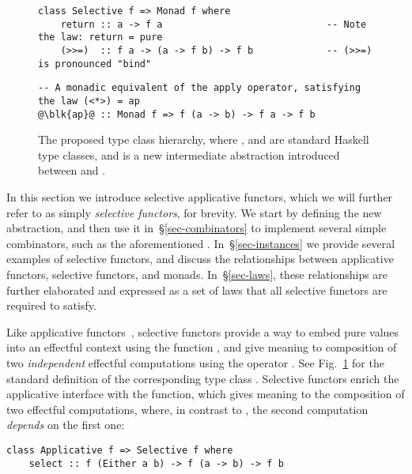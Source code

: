 \begin{figure}
\begin{verbatim}
class Selective f => Monad f where
    return :: a -> f a                             -- Note the law: return = pure
    (>>=)  :: f a -> (a -> f b) -> f b             -- (>>=) is pronounced "bind"
\end{verbatim}
\vspace{0.5mm}
\begin{verbatim}
-- A monadic equivalent of the apply operator, satisfying the law (<*>) = ap
@\blk{ap}@ :: Monad f => f (a -> b) -> f a -> f b
\end{verbatim}
\caption{The proposed type class hierarchy, where , 
and  are standard Haskell type classes, and  is
a new intermediate abstraction introduced between  and
.}\label{fig-types}
\vspace{-2mm}
\end{figure}

In this section we introduce selective applicative functors, which we will
further refer to as simply \emph{selective functors}, for brevity. We start by
defining the new abstraction, and then use it in~\S\ref{sec-combinators} to
implement several simple combinators, such as the aforementioned .
In~\S\ref{sec-instances} we provide several examples of selective functors, and
discuss the relationships between applicative functors, selective functors, and
monads. In~\S\ref{sec-laws}, these relationships are further elaborated and
expressed as a set of laws that all selective functors are required to satisfy.

Like applicative functors~\citep{mcbride2008applicative}, selective functors
provide a way to embed pure values into an effectful context  using the
function , and give meaning to composition of two \emph{independent}
effectful computations using the operator \hs{<*>}. See Fig.~\ref{fig-types} for
the standard definition of the corresponding type class .
Selective functors enrich the applicative interface with the 
function, which gives meaning to the composition of two effectful computations,
where, in contrast to \hs{<*>}, the second computation \emph{depends} on the
first one:

\vspace{1mm}
\begin{verbatim}
class Applicative f => Selective f where
    select :: f (Either a b) -> f (a -> b) -> f b
\end{verbatim}
\vspace{1mm}


